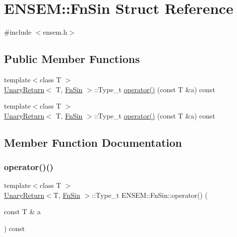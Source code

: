 \hypertarget{structENSEM_1_1FnSin}{}\section{E\+N\+S\+EM\+:\+:Fn\+Sin Struct Reference}
\label{structENSEM_1_1FnSin}


{\ttfamily \#include $<$ensem.\+h$>$}

\subsection*{Public Member Functions}
\begin{DoxyCompactItemize}
\item 
{\footnotesize template$<$class T $>$ }\\\mbox{\hyperlink{structENSEM_1_1UnaryReturn}{Unary\+Return}}$<$ T, \mbox{\hyperlink{structENSEM_1_1FnSin}{Fn\+Sin}} $>$\+::Type\+\_\+t \mbox{\hyperlink{structENSEM_1_1FnSin_aa82ed3f0ebd57960c04e240acba9184b}{operator()}} (const T \&a) const
\item 
{\footnotesize template$<$class T $>$ }\\\mbox{\hyperlink{structENSEM_1_1UnaryReturn}{Unary\+Return}}$<$ T, \mbox{\hyperlink{structENSEM_1_1FnSin}{Fn\+Sin}} $>$\+::Type\+\_\+t \mbox{\hyperlink{structENSEM_1_1FnSin_aa82ed3f0ebd57960c04e240acba9184b}{operator()}} (const T \&a) const
\end{DoxyCompactItemize}


\subsection{Member Function Documentation}
\mbox{\label{structENSEM_1_1FnSin_aa82ed3f0ebd57960c04e240acba9184b}} 
\subsubsection{\texorpdfstring{operator()()}{operator()()}\hspace{0.1cm}{\footnotesize\ttfamily [1/2]}}
{\footnotesize\ttfamily template$<$class T $>$ \\
\mbox{\hyperlink{structENSEM_1_1UnaryReturn}{Unary\+Return}}$<$T, \mbox{\hyperlink{structENSEM_1_1FnSin}{Fn\+Sin}} $>$\+::Type\+\_\+t E\+N\+S\+E\+M\+::\+Fn\+Sin\+::operator() (\begin{DoxyParamCaption}\item[{const T \&}]{a }\end{DoxyParamCaption}) const\hspace{0.3cm}{\ttfamily [inline]}}

